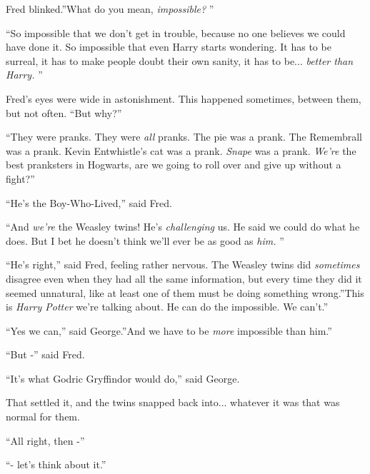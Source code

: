 Fred blinked.''What do you mean, \emph{impossible?} ''

``So impossible that we don't get in trouble, because no one believes we
could have done it. So impossible that even Harry starts wondering. It
has to be surreal, it has to make people doubt their own sanity, it has
to be... \emph{better than Harry.} ''

Fred's eyes were wide in astonishment. This happened sometimes, between
them, but not often. ``But why?''

``They were pranks. They were \emph{all} pranks. The pie was a prank. The
Remembrall was a prank. Kevin Entwhistle's cat was a prank. \emph{Snape}
was a prank. \emph{We're} the best pranksters in Hogwarts, are we going
to roll over and give up without a fight?''

``He's the Boy-Who-Lived,'' said Fred.

``And \emph{we're} the Weasley twins! He's \emph{challenging} us. He said
we could do what he does. But I bet he doesn't think we'll ever be as
good as \emph{him.} ''

``He's right,'' said Fred, feeling rather nervous. The Weasley twins did
\emph{sometimes} disagree even when they had all the same information,
but every time they did it seemed unnatural, like at least one of them
must be doing something wrong.''This is \emph{Harry Potter} we're
talking about. He can do the impossible. We can't.''

``Yes we can,'' said George.''And we have to be \emph{more} impossible
than him.''

``But -'' said Fred.

``It's what Godric Gryffindor would do,'' said George.

That settled it, and the twins snapped back into... whatever it was
that was normal for them.

``All right, then -''

``- let's think about it.''
